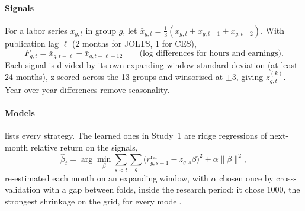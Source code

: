 \paragraph{Signals} For a labor series $x_{g,t}$ in group $g$, let $\bar x_{g,t}=\tfrac13(x_{g,t}+x_{g,t-1}+x_{g,t-2})$. With publication lag $\ell$ (2 months for JOLTS, 1 for CES),
\begin{equation}
F_{g,t}=\bar x_{g,t-\ell}-\bar x_{g,t-\ell-12}\qquad\text{(log differences for hours and earnings).}
\end{equation}
Each signal is divided by its own expanding-window standard deviation (at least 24 months), z-scored across the 13 groups and winsorised at $\pm3$, giving $z^{(k)}_{g,t}$. Year-over-year differences remove seasonality.

\paragraph{Models}  lists every strategy. The learned ones in Study~1 are ridge regressions of next-month relative return on the signals,
\begin{equation}
\hat\beta_t=\arg\min_\beta \sum_{s<t}\sum_g\big(r^{\mathrm{rel}}_{g,s+1}-z_{g,s}^{\top}\beta\big)^2+\alpha\lVert\beta\rVert^2,
\end{equation}
re-estimated each month on an expanding window, with $\alpha$ chosen once by cross-validation with a gap between folds, inside the research period; it chose 1000, the strongest shrinkage on the grid, for every model. %

